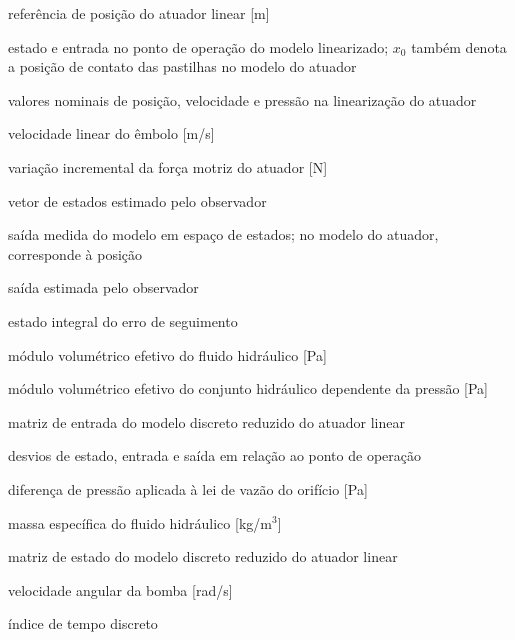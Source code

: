 \begin{simbolos}
    \item[$x_{\mathrm{ref}}$] referência de posição do atuador linear [m]
    \item[$x_0$, $u_0$] estado e entrada no ponto de operação do modelo linearizado; $x_0$ também denota a posição de contato das pastilhas no modelo do atuador
    \item[$\bar{x}_{\mathrm{LAC}}$, $\bar{v}_{\mathrm{LAC}}$, $\bar{P}$] valores nominais de posição, velocidade e pressão na linearização do atuador
    \item[$\dot{x}_{\mathrm{LAC}}$] velocidade linear do êmbolo [m/s]
    \item[$\Delta F_m$] variação incremental da força motriz do atuador [N]
    \item[$\hat{x}$] vetor de estados estimado pelo observador
    \item[$y$] saída medida do modelo em espaço de estados; no modelo do atuador, corresponde à posição
    \item[$\hat{y}$] saída estimada pelo observador
    \item[$z$] estado integral do erro de seguimento
    \item[$\beta$] módulo volumétrico efetivo do fluido hidráulico [Pa]
    \item[$\beta_{\mathrm{eff}}$] módulo volumétrico efetivo do conjunto hidráulico dependente da pressão [Pa]
    \item[$\Gamma$] matriz de entrada do modelo discreto reduzido do atuador linear
    \item[$\delta x$, $\delta u$, $\delta y$] desvios de estado, entrada e saída em relação ao ponto de operação
    \item[$\Delta P$] diferença de pressão aplicada à lei de vazão do orifício [Pa]
    \item[$\rho$] massa específica do fluido hidráulico [kg/m$^3$]
    \item[$\Phi$] matriz de estado do modelo discreto reduzido do atuador linear
    \item[$\omega_p$] velocidade angular da bomba [rad/s]
    \item[$k$] índice de tempo discreto
\end{simbolos}
